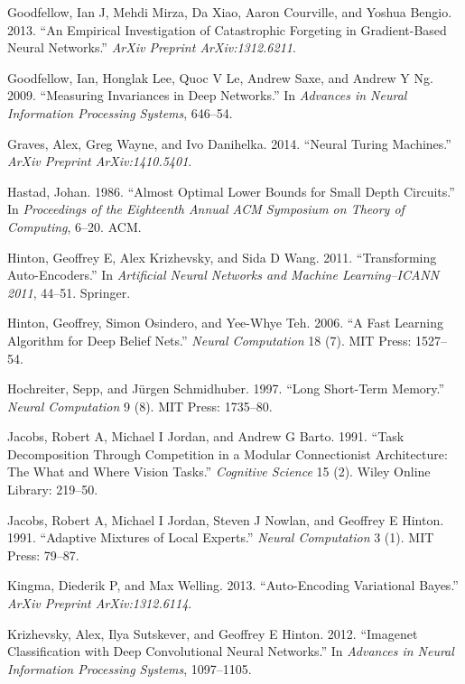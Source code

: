 \documentclass[12pt,twoside]{mitthesis}
\begin{document}
\hypertarget{ref-goodfellow2013empirical}{}
Goodfellow, Ian J, Mehdi Mirza, Da Xiao, Aaron Courville, and Yoshua
Bengio. 2013. ``An Empirical Investigation of Catastrophic Forgeting in
Gradient-Based Neural Networks.'' \emph{ArXiv Preprint ArXiv:1312.6211}.

\hypertarget{ref-goodfellow2009measuring}{}
Goodfellow, Ian, Honglak Lee, Quoc V Le, Andrew Saxe, and Andrew Y Ng.
2009. ``Measuring Invariances in Deep Networks.'' In \emph{Advances in
Neural Information Processing Systems}, 646--54.

\hypertarget{ref-graves2014neural}{}
Graves, Alex, Greg Wayne, and Ivo Danihelka. 2014. ``Neural Turing
Machines.'' \emph{ArXiv Preprint ArXiv:1410.5401}.

\hypertarget{ref-hastad1986almost}{}
Hastad, Johan. 1986. ``Almost Optimal Lower Bounds for Small Depth
Circuits.'' In \emph{Proceedings of the Eighteenth Annual ACM Symposium
on Theory of Computing}, 6--20. ACM.

\hypertarget{ref-hinton2011transforming}{}
Hinton, Geoffrey E, Alex Krizhevsky, and Sida D Wang. 2011.
``Transforming Auto-Encoders.'' In \emph{Artificial Neural Networks and
Machine Learning--ICANN 2011}, 44--51. Springer.

\hypertarget{ref-hinton2006fast}{}
Hinton, Geoffrey, Simon Osindero, and Yee-Whye Teh. 2006. ``A Fast
Learning Algorithm for Deep Belief Nets.'' \emph{Neural Computation} 18
(7). MIT Press: 1527--54.

\hypertarget{ref-hochreiter1997long}{}
Hochreiter, Sepp, and Jürgen Schmidhuber. 1997. ``Long Short-Term
Memory.'' \emph{Neural Computation} 9 (8). MIT Press: 1735--80.

\hypertarget{ref-jacobs1991task}{}
Jacobs, Robert A, Michael I Jordan, and Andrew G Barto. 1991. ``Task
Decomposition Through Competition in a Modular Connectionist
Architecture: The What and Where Vision Tasks.'' \emph{Cognitive
Science} 15 (2). Wiley Online Library: 219--50.

\hypertarget{ref-jacobs1991adaptive}{}
Jacobs, Robert A, Michael I Jordan, Steven J Nowlan, and Geoffrey E
Hinton. 1991. ``Adaptive Mixtures of Local Experts.'' \emph{Neural
Computation} 3 (1). MIT Press: 79--87.

\hypertarget{ref-kingma2013auto}{}
Kingma, Diederik P, and Max Welling. 2013. ``Auto-Encoding Variational
Bayes.'' \emph{ArXiv Preprint ArXiv:1312.6114}.

\hypertarget{ref-krizhevsky2012imagenet}{}
Krizhevsky, Alex, Ilya Sutskever, and Geoffrey E Hinton. 2012.
``Imagenet Classification with Deep Convolutional Neural Networks.'' In
\emph{Advances in Neural Information Processing Systems}, 1097--1105.
\end{document}
